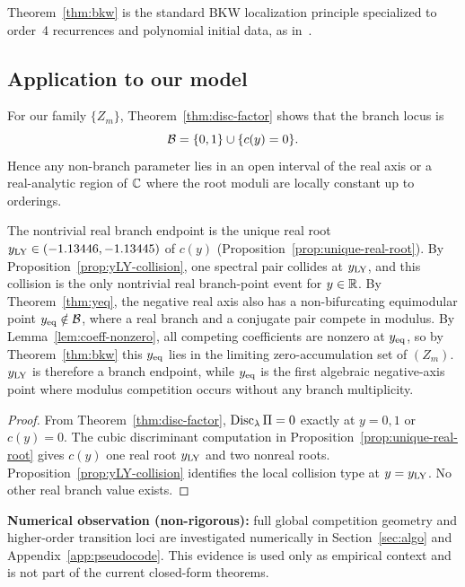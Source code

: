 \begin{remark}
Theorem~\ref{thm:bkw} is the standard BKW localization principle specialized to order~4 recurrences and polynomial initial data, as in~\cite{Sokal2001}.
\end{remark}

\subsection{Application to our model}

For our family \(\{Z_m\}\), Theorem~\ref{thm:disc-factor} shows that the branch locus is
\[
\mathcal{B}=\{0,1\}\cup\{c(y)=0\}.
\]
Hence any non-branch parameter lies in an open interval of the real axis or a real-analytic region of \(\mathbb{C}\) where the root moduli are locally constant up to orderings.

\begin{proposition}\label{prop:real-branch-endpoints}
The nontrivial real branch endpoint is the unique real root \(y_{\mathrm{LY}}\in(-1.13446,-1.13445)\) of \(c(y)\) (Proposition~\ref{prop:unique-real-root}).
By Proposition~\ref{prop:yLY-collision}, one spectral pair collides at \(y_{\mathrm{LY}}\), and this collision is the only nontrivial real branch-point event for \(y\in\mathbb{R}\).
By Theorem~\ref{thm:yeq}, the negative real axis also has a non-bifurcating equimodular point \(y_{\mathrm{eq}}\notin\mathcal{B}\), where a real branch and a conjugate pair compete in modulus.
By Lemma~\ref{lem:coeff-nonzero}, all competing coefficients are nonzero at \(y_{\mathrm{eq}}\), so by Theorem~\ref{thm:bkw} this \(y_{\mathrm{eq}}\) lies in the limiting zero-accumulation set of \((Z_m)\).
\(y_{\mathrm{LY}}\) is therefore a branch endpoint, while \(y_{\mathrm{eq}}\) is the first algebraic negative-axis point where modulus competition occurs without any branch multiplicity.
\end{proposition}

\begin{proof}
From Theorem~\ref{thm:disc-factor}, \(\operatorname{Disc}_\lambda\Pi=0\) exactly at \(y=0,1\) or \(c(y)=0\).
The cubic discriminant computation in Proposition~\ref{prop:unique-real-root} gives \(c(y)\) one real root \(y_{\mathrm{LY}}\) and two nonreal roots.
Proposition~\ref{prop:yLY-collision} identifies the local collision type at \(y=y_{\mathrm{LY}}\).
No other real branch value exists.
\end{proof}

\begin{remark}\label{rmk:equimodular-numeric}
\textbf{Numerical observation (non-rigorous):} full global competition geometry and higher-order transition loci are investigated numerically in Section~\ref{sec:algo} and Appendix~\ref{app:pseudocode}. 
This evidence is used only as empirical context and is not part of the current closed-form theorems.
\end{remark}

